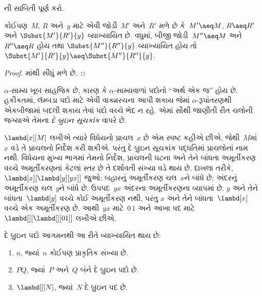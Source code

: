 \begin{prob}
  ની સાબિતી પૂર્ણ કરો.
\end{prob}

\begin{cor}
  કોઈપણ~$M$, $R$ અને~$y$ માટે એવી જોડી~$M'$ અને~$R'$
  મળે છે કે~$M' \aeq M$, $R \aeq R'$ અને
  $\Subst{M'}{R'}{y}$ વ્યાખ્યાયિત છે. વધુમાં, બીજી
  જોડી~$M'' \aeq M$ અને~$R'' \aeq R$ હોય તથા
  $\Subst{M''}{R''}{y}$ વ્યાખ્યાયિત હોય તો
  $\Subst{M'}{R'}{y} \aeq
  \Subst{M''}{R''}{y}$.
\end{cor}

\begin{proof}
  માંથી સીધું મળે છે.
\end{proof}
\endgroup


\begingroup
\makeatletter{}\makeatother


\label{guunit:OLP-0363}


$\alpha$-સામ્ય ખૂબ સાહજિક છે, કારણ કે $\alpha$-સામ્યવાળાં
પદોનો ``અર્થ એક જ'' હોય છે. હકીકતમાં, લૅમ્બડા પદો માટે એવી
વાક્યરચના આપી શકાય જેમાં $\alpha$-રૂપાંતરણથી એકબીજામાં
બદલી શકાય તેવાં પદો વચ્ચે ભેદ ન રહે. એમાં સૌથી જાણીતી
રીત ચલોની જગ્યાએ તેમના \emph{દે બ્રુઇન સૂચકાંક} વાપરે છે.

$\lambd[x][M]$ લખીએ ત્યારે વિધેયનો પ્રાચલ~$x$ છે એમ
સ્પષ્ટ કહીએ છીએ, જેથી~$M$માં~$x$ વડે તે પ્રાચલનો નિર્દેશ
કરી શકીએ. પરંતુ દે બ્રુઇન સૂચકાંક પદ્ધતિમાં પ્રાચલોનાં નામ
નથી. વિધેયના મુખ્ય ભાગમાં તેમનો નિર્દેશ, પ્રાચલની ઘટના અને
તેને બાંધતા અમૂર્તીકરણ વચ્ચે અમૂર્તીકરણનાં કેટલાં સ્તર છે
તે દર્શાવતી સંખ્યા વડે થાય છે. દાખલા તરીકે,
$\lambd[x][\lambd[y][y x]]$ જુઓ: બહારનું અમૂર્તીકરણ
ચલ~$x$ને બાંધે છે; અંદરનું અમૂર્તીકરણ ચલ~$y$ને બાંધે છે.
ઉપપદ~$y x$ અંદરના અમૂર્તીકરણના વ્યાપમાં છે. $y$ અને
તેને બાંધતા~$\lambd[y]$ વચ્ચે કોઈ અમૂર્તીકરણ નથી, પરંતુ
$x$ અને તેને બાંધતા~$\lambd[x]$ વચ્ચે એક અમૂર્તીકરણ છે.
આથી~$y x$ માટે~$0\, 1$ અને આખા પદ માટે
$\lambd[][\lambd[][01]]$ લખીએ છીએ.

\begin{defn}
  દે બ્રુઇન પદો આગમનથી આ રીતે વ્યાખ્યાયિત થાય છે:
  \begin{enumerate}
  \item $n$, જ્યાં~$n$ કોઈપણ પ્રાકૃતિક સંખ્યા છે.
  \item $PQ$, જ્યાં~$P$ અને~$Q$ બંને દે બ્રુઇન પદો છે.
  \item $\lambd[][N]$, જ્યાં~$N$ દે બ્રુઇન પદ છે.
  \end{enumerate}
\end{defn}

